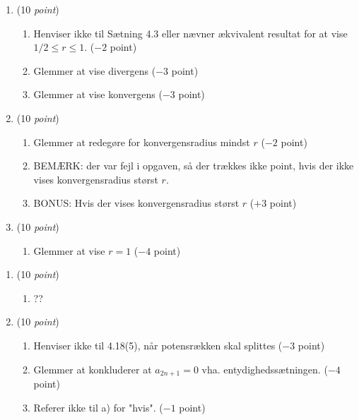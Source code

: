 \documentclass{article}
\begin{document}
\begin{opg}\hfill
	\begin{enumerate}
		\item (10 \emph{point})\begin{enumerate}[label=(\roman*)]
			\item Henviser ikke til Sætning 4.3 eller nævner ækvivalent resultat for at vise $ 1/2\leq r\leq1 $. ($ -2 $ point)
			\item Glemmer at vise divergens ($ -3 $ point)
			\item Glemmer at vise konvergens ($ -3 $ point)
		\end{enumerate}
		\item (10 \emph{point})\begin{enumerate}[label=(\roman*)]
			\item Glemmer at redegøre for konvergensradius mindst $ r $ ($ -2  $ point) 
			\item BEMÆRK: der var fejl i opgaven, så der trækkes ikke point, hvis der ikke vises konvergensradius størst $ r $.
			\item BONUS: Hvis der vises konvergensradius størst $ r $ ($ +3 $ point)
		\end{enumerate}
		\item (10 \emph{point})\begin{enumerate}[label=(\roman*)]
			\item Glemmer at vise $ r=1 $ ($ -4 $ point)
		\end{enumerate}
	\end{enumerate}
\end{opg}
\begin{opg}\hfill
	\begin{enumerate}
		\item (10 \emph{point})\begin{enumerate}[label=(\roman*)]
			\item ??
		\end{enumerate}
		\item (10 \emph{point})\begin{enumerate}[label=(\roman*)]
			\item Henviser ikke til 4.18(5), når potensrækken skal splittes ($ -3 $ point)
			\item Glemmer at konkluderer at $ a_{2n+1}=0 $ vha. entydighedssætningen. ($ -4 $ point)
			\item Referer ikke til a) for "hvis". ($ -1 $ point)
		\end{enumerate}
	\end{enumerate}
\end{opg}
\end{document}

